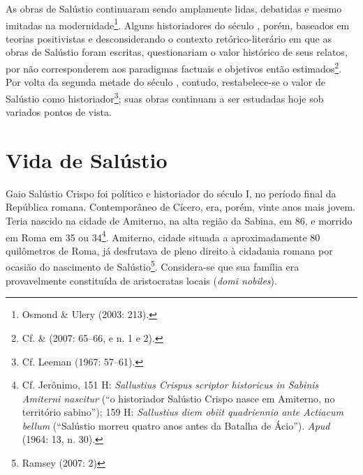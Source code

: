 As
obras de Salústio continuaram sendo amplamente lidas, debatidas e mesmo
imitadas na modernidade\footnote{Osmond \& Ulery (2003: 213).}. Alguns
historiadores do século , porém, baseados em teorias positivistas e
desconsiderando o contexto retórico-literário em que as obras de Salústio foram
escritas, questionariam o valor histórico de seus relatos, por não
corresponderem aos paradigmas factuais e objetivos então estimados\footnote{Cf.  \&  (2007: 65--66, e n. 1 e 2).}.  Por volta da segunda
  metade do século , contudo, restabelece-se o valor de Salústio
  como historiador\footnote{Cf. Leeman (1967: 57--61).}; suas obras
  continuam a ser estudadas hoje sob variados pontos de vista.


\section{Vida de Salústio}

Gaio Salústio Crispo foi político e historiador do século I, no período
final da República romana.  Contemporâneo de Cícero, era, porém, vinte anos
mais jovem. Teria nascido na cidade de Amiterno, na alta região da Sabina, em
86, e morrido em Roma em 35 ou 34\footnote{Cf. Jerônimo,  151 H:
\emph{Sallustius Crispus scriptor historicus in Sabinis Amiterni nascitur} (``o historiador Salústio Crispo nasce em Amiterno, no território sabino''); 
159 H: \emph{Sallustius diem obiit quadriennio ante Actiacum bellum} (``Salústio morreu quatro anos antes da Batalha de Ácio'').
\emph{Apud}  (1964:  13, n. 30).}. Amiterno, cidade situada
a aproximadamente 80 quilômetros de Roma, já desfrutava de pleno direito à
cidadania romana por ocasião do nascimento de Salústio\footnote{Ramsey (2007: 2)}. Considera-se que sua família era provavelmente constituída de
aristocratas locais (\emph{domi nobiles}). 

